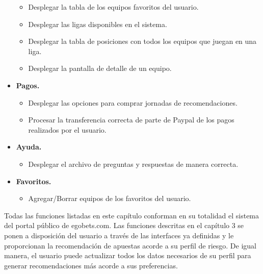 \begin{itemize}
			\begin{itemize}
				\item Desplegar la tabla de los equipos favoritos del usuario.
				\item Desplegar las ligas disponibles en el sistema.
				\item Desplegar la tabla de posiciones con todos los equipos que juegan en una liga.
				\item Desplegar la pantalla de detalle de un equipo.
			\end{itemize}
			\item \textbf{Pagos.}
			\begin{itemize}
				\item Desplegar las opciones para comprar jornadas de recomendaciones.
				\item Procesar la transferencia correcta de parte de Paypal de los pagos realizados por el usuario.
			\end{itemize}
			\item \textbf{Ayuda.}
			\begin{itemize}
				\item Desplegar el archivo de preguntas y respuestas de manera correcta.
			\end{itemize}
			\item \textbf{Favoritos.}
			\begin{itemize}
				\item Agregar/Borrar equipos de los favoritos del usuario.
			\end{itemize}

		\end{itemize}


Todas las funciones listadas en este capítulo conforman en su totalidad el sistema del portal público de egobets.com. Las funciones descritas en el capítulo 3 se ponen a disposición del usuario a través de las interfaces ya definidas y le proporcionan la recomendación de apuestas acorde a su perfil de riesgo. De igual manera, el usuario puede actualizar todos los datos necesarios de su perfil para generar recomendaciones más acorde a sus preferencias.

